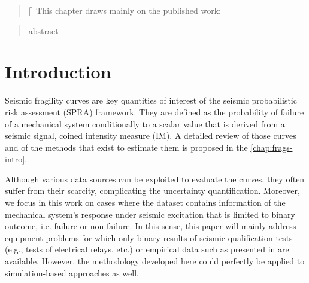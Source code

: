 


\begin{abstract}[\hspace*{-10pt}]
    This chapter draws mainly on the published work:   %
\end{abstract}

\begin{abstract}
    abstract
\end{abstract}


\minitoc

\section{Introduction}


Seismic fragility curves are key quantities of interest of the seismic probabilistic risk assessment (SPRA) framework.
They are defined as the probability of failure of a mechanical system conditionally to a scalar value that is derived from a seismic signal, coined intensity measure (IM).
A detailed review of those curves and of the methods that exist to estimate them is proposed in the \cref{chap:frags-intro}.

Although various data sources can be exploited to evaluate the curves, they often suffer from their scarcity,
complicating the uncertainty quantification.
Moreover, we focus in this work on cases where the dataset contains information of the mechanical system's response under seismic excitation that is limited to binary outcome, i.e. failure or non-failure.
In this sense, this paper will mainly address equipment problems for which only binary results of seismic qualification tests (e.g., tests of electrical relays, etc.) or empirical data such as presented in \cite{straub_improved_2008} are available. However, the methodology developed here could perfectly be applied to simulation-based approaches as well.




